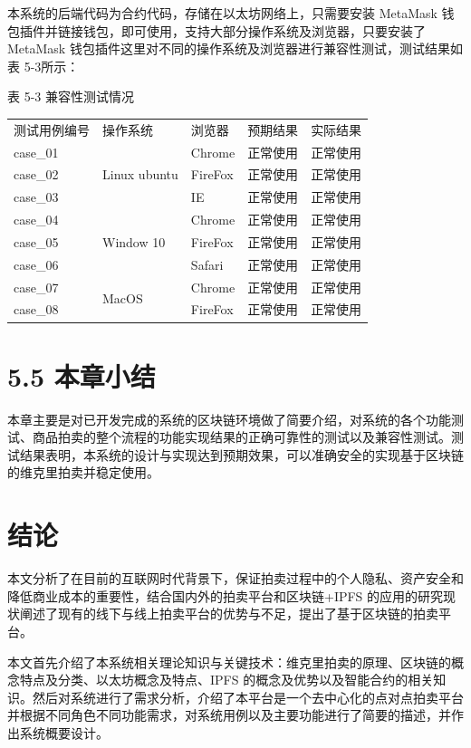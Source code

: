 \documentclass[
  10
]{article}
\newcounter{none} %
\begin{document}
本系统的后端代码为合约代码，存储在以太坊网络上，只需要安装 MetaMask
钱包插件并链接钱包，即可使用，支持大部分操作系统及浏览器，只要安装了
MetaMask
钱包插件这里对不同的操作系统及浏览器进行兼容性测试，测试结果如表
5-3所示：

表 5-3 兼容性测试情况

{\def\LTcaptype{none} %
\begin{longtable}[]{@{}lllll@{}}
\toprule\noalign{}
\endhead
\bottomrule\noalign{}
\endlastfoot
测试用例编号 & 操作系统 & 浏览器 & 预期结果 & 实际结果 \\
case\_01 & \multirow{3}{*}{Linux ubuntu} & Chrome & 正常使用 &
正常使用 \\
case\_02 & & FireFox & 正常使用 & 正常使用 \\
case\_03 & & IE & 正常使用 & 正常使用 \\
case\_04 & \multirow{3}{*}{Window 10} & Chrome & 正常使用 & 正常使用 \\
case\_05 & & FireFox & 正常使用 & 正常使用 \\
case\_06 & & Safari & 正常使用 & 正常使用 \\
case\_07 & \multirow{2}{*}{MacOS} & Chrome & 正常使用 & 正常使用 \\
case\_08 & & FireFox & 正常使用 & 正常使用 \\
\end{longtable}
}

\section{5.5 本章小结}\label{ux672cux7ae0ux5c0fux7ed3-4}

本章主要是对已开发完成的系统的区块链环境做了简要介绍，对系统的各个功能测试、商品拍卖的整个流程的功能实现结果的正确可靠性的测试以及兼容性测试。测试结果表明，本系统的设计与实现达到预期效果，可以准确安全的实现基于区块链的维克里拍卖并稳定使用。

\section{结论}\label{ux7ed3ux8bba}

本文分析了在目前的互联网时代背景下，保证拍卖过程中的个人隐私、资产安全和降低商业成本的重要性，结合国内外的拍卖平台和区块链+IPFS
的应用的研究现状阐述了现有的线下与线上拍卖平台的优势与不足，提出了基于区块链的拍卖平台。

本文首先介绍了本系统相关理论知识与关键技术：维克里拍卖的原理、区块链的概念特点及分类、以太坊概念及特点、IPFS
的概念及优势以及智能合约的相关知识。然后对系统进行了需求分析，介绍了本平台是一个去中心化的点对点拍卖平台并根据不同角色不同功能需求，对系统用例以及主要功能进行了简要的描述，并作出系统概要设计。
\end{document}
